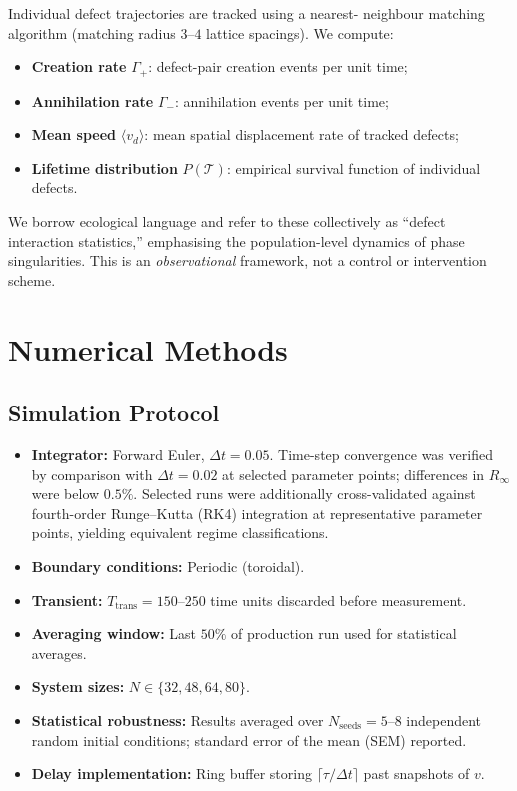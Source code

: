 \documentclass[11pt,a4paper]{article}
\begin{document}
Individual defect trajectories are tracked using a nearest-
neighbour matching algorithm (matching radius $3$--$4$ lattice
spacings). We compute:
\begin{itemize}
    \item \textbf{Creation rate} $\Gamma_+$: defect-pair
          creation events per unit time;
    \item \textbf{Annihilation rate} $\Gamma_-$: annihilation
          events per unit time;
    \item \textbf{Mean speed} $\langle v_d \rangle$: mean
          spatial displacement rate of tracked defects;
    \item \textbf{Lifetime distribution} $P(\mathcal{T})$:
          empirical survival function of individual defects.
\end{itemize}
We borrow ecological language and refer to these collectively
as ``defect interaction statistics,'' emphasising the
population-level dynamics of phase singularities. This is an
\textit{observational} framework, not a control or intervention
scheme.

\section{Numerical Methods}
\label{sec:methods}

\subsection{Simulation Protocol}

\begin{itemize}
    \item \textbf{Integrator:} Forward Euler, $\Delta t = 0.05$.
          Time-step convergence was verified by comparison with
          $\Delta t = 0.02$ at selected parameter points;
          differences in $R_\infty$ were below $0.5\%$.
          Selected runs were additionally cross-validated
          against fourth-order Runge--Kutta (RK4) integration
          at representative parameter points, yielding
          equivalent regime classifications.
    \item \textbf{Boundary conditions:} Periodic (toroidal).
    \item \textbf{Transient:} $T_{\text{trans}} = 150$--$250$
          time units discarded before measurement.
    \item \textbf{Averaging window:} Last $50\%$ of production
          run used for statistical averages.
    \item \textbf{System sizes:} $N \in \{32, 48, 64, 80\}$.
    \item \textbf{Statistical robustness:} Results averaged over
          $N_{\text{seeds}} = 5$--$8$ independent random initial
          conditions; standard error of the mean (SEM) reported.
    \item \textbf{Delay implementation:} Ring buffer storing
          $\lceil\tau/\Delta t\rceil$ past snapshots of $v$.
\end{itemize}
\end{document}
